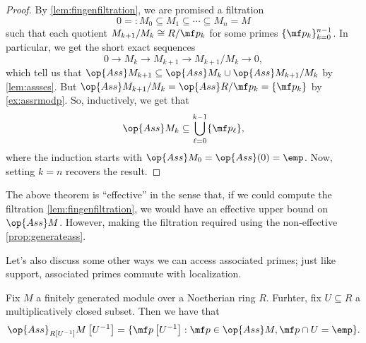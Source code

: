 \begin{proof}
	By \autoref{lem:fingenfiltration}, we are promised a filtration
	\[0=:M_0\subseteq M_1\subseteq\cdots\subseteq M_n=M\]
	such that each quotient $M_{k+1}/M_k\cong R/\mf p_k$ for some primes $\{\mf p_k\}_{k=0}^{n-1}$. In particular, we get the short exact sequences
	\[0\to M_k\to M_{k+1}\to M_{k+1}/M_k\to0,\]
	which tell us that $\op{Ass}M_{k+1}\subseteq\op{Ass}M_k\cup\op{Ass}M_{k+1}/M_k$ by \autoref{lem:assses}. But $\op{Ass}M_{k+1}/M_k=\op{Ass}R/\mf p_k=\{\mf p_k\}$ by \autoref{ex:assrmodp}. So, inductively, we get that
	\[\op{Ass}M_k\subseteq\bigcup_{\ell=0}^{k-1}\{\mf p_\ell\},\]
	where the induction starts with $\op{Ass}M_0=\op{Ass}(0)=\emp$. Now, setting $k=n$ recovers the result.
\end{proof}
\begin{remark}[Nir]
	The above theorem is ``effective'' in the sense that, if we could compute the filtration \autoref{lem:fingenfiltration}, we would have an effective upper bound on $\op{Ass}M$. However, making the filtration required using the non-effective \autoref{prop:generateass}.
\end{remark}
Let's also discuss some other ways we can access associated primes; just like support, associated primes commute with localization.
\begin{proposition} \label{prop:localizeass}
	Fix $M$ a finitely generated module over a Noetherian ring $R$. Furhter, fix $U\subseteq R$ a multiplicatively closed subset. Then we have that
	\[\op{Ass}_{R\left[U^{-1}\right]}M\left[U^{-1}\right]=\{\mf p\left[U^{-1}\right]:\mf p\in\op{Ass}M,\mf p\cap U=\emp\}.\]
\end{proposition}
